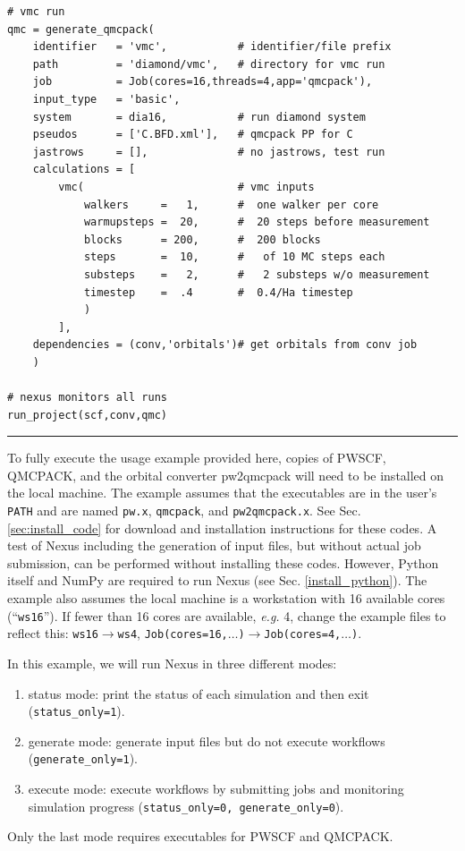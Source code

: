 \documentclass[oneside,11pt]{memoir}
\numberwithin{equation}{section}
\newcommand{\HRule}{\rule{\linewidth}{0.5mm}}
\begin{document}
\begin{verbatim}
# vmc run
qmc = generate_qmcpack(
    identifier   = 'vmc',           # identifier/file prefix 
    path         = 'diamond/vmc',   # directory for vmc run
    job          = Job(cores=16,threads=4,app='qmcpack'),
    input_type   = 'basic',
    system       = dia16,           # run diamond system
    pseudos      = ['C.BFD.xml'],   # qmcpack PP for C
    jastrows     = [],              # no jastrows, test run
    calculations = [
        vmc(                        # vmc inputs
            walkers     =   1,      #  one walker per core
            warmupsteps =  20,      #  20 steps before measurement
            blocks      = 200,      #  200 blocks
            steps       =  10,      #   of 10 MC steps each
            substeps    =   2,      #   2 substeps w/o measurement
            timestep    =  .4       #  0.4/Ha timestep
            )
        ],
    dependencies = (conv,'orbitals')# get orbitals from conv job
    )

# nexus monitors all runs
run_project(scf,conv,qmc)
\end{verbatim}
\HRule


To fully execute the usage example provided here, copies of PWSCF, QMCPACK, and the orbital converter pw2qmcpack will need to be installed on the local machine.  The example assumes that the executables are in the user's \texttt{PATH} and are named \texttt{pw.x}, \texttt{qmcpack}, and \texttt{pw2qmcpack.x}.  See Sec. \ref{sec:install_code} for download and installation instructions for these codes. A test of Nexus including the generation of input files, but without actual job submission, can be performed without installing these codes.  However, Python itself and NumPy are required to run Nexus (see Sec. \ref{install_python}).    The example also assumes the local machine is a workstation with 16 available cores (``\texttt{ws16}'').  If fewer than 16 cores are available, \emph{e.g.} 4, change the example files to reflect this: \texttt{ws16}$\rightarrow$\texttt{ws4}, \texttt{Job(cores=16,$\ldots$)}$\rightarrow$\texttt{Job(cores=4,$\ldots$)}. 

In this example, we will run Nexus in three different modes:
\begin{enumerate}
  \item{status mode: print the status of each simulation and then exit (\texttt{status\_only=1}).}
  \item{generate mode: generate input files but do not execute workflows (\texttt{generate\_only=1}).}
  \item{execute mode: execute workflows by submitting jobs and monitoring simulation progress (\texttt{status\_only=0, generate\_only=0}).}
\end{enumerate}
Only the last mode requires executables for PWSCF and QMCPACK.
\end{document}

